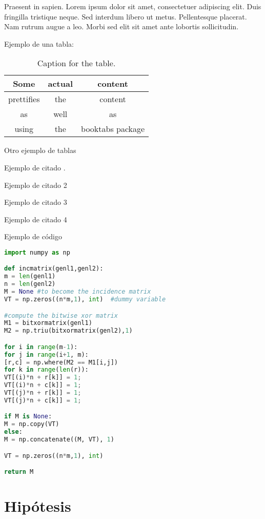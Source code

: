 Praesent in sapien. Lorem ipsum dolor sit amet, consectetuer adipiscing 
elit. Duis fringilla tristique neque. Sed interdum libero ut metus. 
Pellentesque placerat. Nam rutrum augue a leo. Morbi sed elit sit amet 
ante lobortis sollicitudin.

Ejemplo de una tabla:

\begin{table}[h!]
	\centering
	\caption{Caption for the table.}
	\label{tab:table1}
	\begin{tabular}{ccc}
		\toprule
		Some & actual & content\\
		\midrule
		prettifies & the & content\\
		as & well & as\\
		using & the & booktabs package\\
		\bottomrule
	\end{tabular}
\end{table}

Otro ejemplo de tablas



Ejemplo de citado \cite{Vickrey1961}.

Ejemplo de citado 2 

Ejemplo de citado 3 \cite{baggio}

Ejemplo de citado 4 

Ejemplo de código

\begin{lstlisting}[language=Python, caption=Python example]
import numpy as np

def incmatrix(genl1,genl2):
m = len(genl1)
n = len(genl2)
M = None #to become the incidence matrix
VT = np.zeros((n*m,1), int)  #dummy variable

#compute the bitwise xor matrix
M1 = bitxormatrix(genl1)
M2 = np.triu(bitxormatrix(genl2),1) 

for i in range(m-1):
for j in range(i+1, m):
[r,c] = np.where(M2 == M1[i,j])
for k in range(len(r)):
VT[(i)*n + r[k]] = 1;
VT[(i)*n + c[k]] = 1;
VT[(j)*n + r[k]] = 1;
VT[(j)*n + c[k]] = 1;

if M is None:
M = np.copy(VT)
else:
M = np.concatenate((M, VT), 1)

VT = np.zeros((n*m,1), int)

return M
\end{lstlisting}

\section{Hipótesis}


